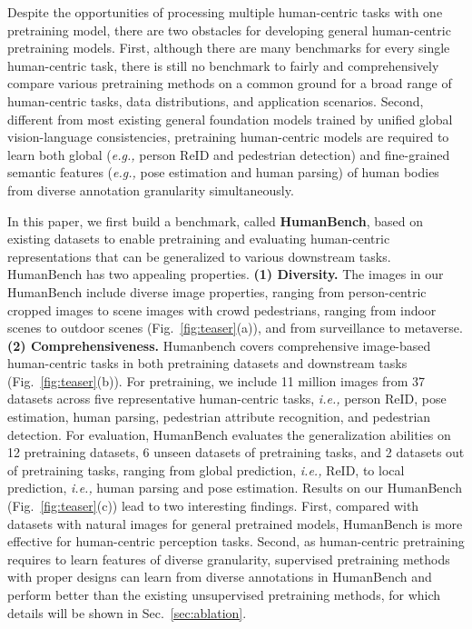 \documentclass[10pt,twocolumn,letterpaper]{article}
\begin{document}
Despite the opportunities of processing multiple human-centric tasks with one pretraining model, there are two obstacles for developing general human-centric pretraining models. First, although there are many benchmarks for every single human-centric task, there is still no benchmark to fairly and comprehensively compare various pretraining methods on a common ground for a broad range of human-centric tasks, data distributions, and application scenarios. Second, different from most existing general foundation models trained by unified global vision-language consistencies, pretraining human-centric models are required to learn both global (\emph{e.g.,} person ReID and pedestrian detection) and fine-grained semantic features (\emph{e.g.,} pose estimation and human parsing) of human bodies from diverse annotation granularity simultaneously.



In this paper, we first build a benchmark, called \textbf{HumanBench}, based on existing datasets to enable pretraining and evaluating human-centric representations that can be generalized to various downstream tasks.  
HumanBench has two appealing properties. \textbf{(1) Diversity.} The images in our HumanBench include diverse image properties, ranging from person-centric cropped images to scene images with crowd pedestrians, ranging from indoor scenes to outdoor scenes (Fig.~\ref{fig:teaser}(a)), and from surveillance to metaverse. \textbf{(2) Comprehensiveness.} Humanbench covers comprehensive image-based human-centric tasks in both pretraining datasets and downstream tasks (Fig.~\ref{fig:teaser}(b)). For pretraining, we include 11 million images from 37 datasets across five representative human-centric tasks, \emph{i.e.,} person ReID, pose estimation, human parsing, pedestrian attribute recognition, and pedestrian detection. For evaluation, HumanBench evaluates the generalization abilities on 12 pretraining datasets, 6 unseen datasets of pretraining tasks, and 2 datasets out of pretraining tasks, ranging from global prediction, \emph{i.e.,} ReID, to local prediction, \emph{i.e.,} human parsing and pose estimation. Results on our HumanBench (Fig.~\ref{fig:teaser}(c)) 
lead to two interesting findings. First, compared with datasets with natural images for general pretrained models,  HumanBench is more effective for human-centric perception tasks. Second, as human-centric pretraining requires to learn features of diverse granularity, supervised pretraining methods with proper designs can learn from diverse annotations in HumanBench and perform better than the existing unsupervised pretraining methods, for which details will be shown in Sec.~\ref{sec:ablation}.
\end{document}
